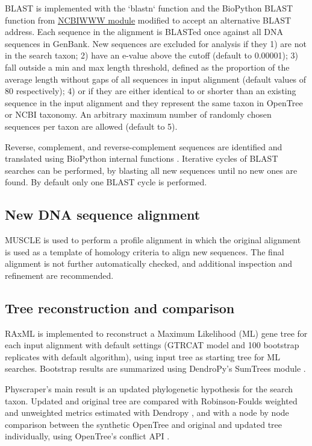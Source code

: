 \documentclass{bmcart}
\begin{document}
BLAST is implemented with the `blastn` function \cite{camacho2009blast} and the BioPython
\cite{cock2009biopython} BLAST function from
\href{https://biopython.org/DIST/docs/api/Bio.Blast.NCBIWWW-module.html}{NCBIWWW module}
modified to accept an alternative BLAST address.
Each sequence in the alignment is BLASTed once against all DNA sequences in GenBank.
New sequences are excluded for analysis if they 1) are not in the search taxon;
2) have an e-value above the cutoff (default to 0.00001); 3) fall outside a min
and max length threshold, defined as the proportion of the average length without
gaps of all sequences in input alignment (default values of 80%
respectively); 4) or if they are either identical to or shorter than an existing
sequence in the input alignment and they represent the same taxon in OpenTree or
NCBI taxonomy.
An arbitrary maximum number of randomly chosen sequences per taxon are allowed
(default to 5).

Reverse, complement, and reverse-complement sequences are identified and translated
using BioPython internal functions \cite{cock2009biopython}.
Iterative cycles of BLAST searches can be performed, by blasting all new sequences
until no new ones are found. By default only one BLAST cycle is performed.

\subsection*{New DNA sequence alignment}

MUSCLE \cite{edgar2004muscle} is used to perform a profile alignment in which the
original alignment is used as a template of homology criteria to align new sequences.
The final alignment is not further automatically checked, and additional inspection
and refinement are recommended.

\subsection*{Tree reconstruction and comparison}

RAxML \cite{stamatakis2014raxml} is implemented to reconstruct a Maximum Likelihood
(ML) gene tree for each input alignment with default settings (GTRCAT model and
100 bootstrap replicates with default algorithm), using input tree as starting
tree for ML searches.
Bootstrap results are summarized using DendroPy's SumTrees module
\cite{sukumaran2010dendropy}.

Physcraper's main result is an updated phylogenetic hypothesis for the search taxon.
Updated and original tree are compared with Robinson-Foulds weighted and unweighted
metrics estimated with Dendropy \cite{sukumaran2010dendropy}, and with a node by node
comparison between the synthetic OpenTree and original and updated tree individually,
using OpenTree's conflict API \cite{redelings2017supertree}.
\end{document}
